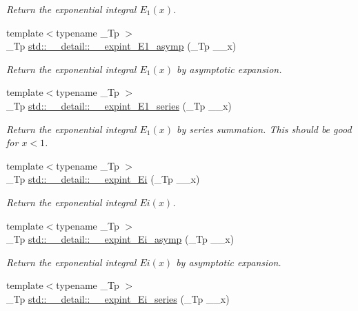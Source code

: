 \begin{DoxyCompactItemize}
\begin{DoxyCompactList}\small\item\em Return the exponential integral $ E_1(x) $. \end{DoxyCompactList}\item 
{\footnotesize template$<$typename \+\_\+\+Tp $>$ }\\\+\_\+\+Tp \hyperlink{namespacestd_1_1____detail_abd02a300cd209be618a6e054a706c012}{std\+::\+\_\+\+\_\+detail\+::\+\_\+\+\_\+expint\+\_\+\+E1\+\_\+asymp} (\+\_\+\+Tp \+\_\+\+\_\+x)
\begin{DoxyCompactList}\small\item\em Return the exponential integral $ E_1(x) $ by asymptotic expansion. \end{DoxyCompactList}\item 
{\footnotesize template$<$typename \+\_\+\+Tp $>$ }\\\+\_\+\+Tp \hyperlink{namespacestd_1_1____detail_ad162f66405bde5ccd5a7cdabbe1966f7}{std\+::\+\_\+\+\_\+detail\+::\+\_\+\+\_\+expint\+\_\+\+E1\+\_\+series} (\+\_\+\+Tp \+\_\+\+\_\+x)
\begin{DoxyCompactList}\small\item\em Return the exponential integral $ E_1(x) $ by series summation. This should be good for $ x < 1 $. \end{DoxyCompactList}\item 
{\footnotesize template$<$typename \+\_\+\+Tp $>$ }\\\+\_\+\+Tp \hyperlink{namespacestd_1_1____detail_ab2f8bf37caa4993de28306a2a634ed6f}{std\+::\+\_\+\+\_\+detail\+::\+\_\+\+\_\+expint\+\_\+\+Ei} (\+\_\+\+Tp \+\_\+\+\_\+x)
\begin{DoxyCompactList}\small\item\em Return the exponential integral $ Ei(x) $. \end{DoxyCompactList}\item 
{\footnotesize template$<$typename \+\_\+\+Tp $>$ }\\\+\_\+\+Tp \hyperlink{namespacestd_1_1____detail_ac272ec880c6d4be02b56089a1cebc46d}{std\+::\+\_\+\+\_\+detail\+::\+\_\+\+\_\+expint\+\_\+\+Ei\+\_\+asymp} (\+\_\+\+Tp \+\_\+\+\_\+x)
\begin{DoxyCompactList}\small\item\em Return the exponential integral $ Ei(x) $ by asymptotic expansion. \end{DoxyCompactList}\item 
{\footnotesize template$<$typename \+\_\+\+Tp $>$ }\\\+\_\+\+Tp \hyperlink{namespacestd_1_1____detail_a7582d1305e84e0263cc6ec2a00a2bf7d}{std\+::\+\_\+\+\_\+detail\+::\+\_\+\+\_\+expint\+\_\+\+Ei\+\_\+series} (\+\_\+\+Tp \+\_\+\+\_\+x)

\end{DoxyCompactItemize}
